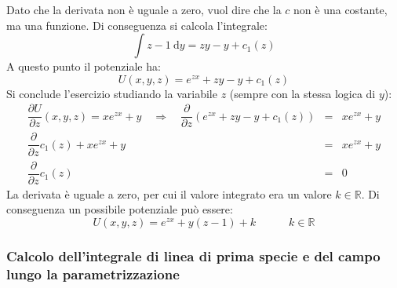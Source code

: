 \documentclass[a4paper]{article}
\begin{document}
	Dato che la derivata non è uguale a zero, vuol dire che la $c$ non è una costante, ma una funzione. Di conseguenza si calcola l'integrale:
	\begin{equation*}
		\displaystyle\int z-1 \:\mathrm{d}y = zy-y + c_{1}\left(z\right)
	\end{equation*}
	A questo punto il potenziale ha:
	\begin{equation*}
		U\left(x,y,z\right) = e^{zx} + zy - y + c_{1}\left(z\right)
	\end{equation*}
	Si conclude l'esercizio studiando la variabile $z$ (sempre con la stessa logica di $y$):
	\begin{equation*}
		\begin{array}{rcl}
			\dfrac{\partial U}{\partial z}\left(x,y,z\right) = xe^{zx}+y \hspace{1em}\Longrightarrow\hspace{1em} \dfrac{\partial}{\partial z}\left(e^{zx} + zy - y + c_{1}\left(z\right)\right) &=& xe^{zx}+y \\ [1em]
			\dfrac{\partial}{\partial z}c_{1}\left(z\right) + xe^{zx} + y &=& xe^{zx}+y \\ [1em]
			\dfrac{\partial}{\partial z}c_{1}\left(z\right) &=& 0
		\end{array}
	\end{equation*}
	La derivata è uguale a zero, per cui il valore integrato era un valore $k \in \mathbb{R}$. Di conseguenza un possibile potenziale può essere:
	\begin{equation*}
		U\left(x,y,z\right) = e^{zx} + y\left(z-1\right) + k \hspace{3em} k \in \mathbb{R}
	\end{equation*}

	\newpage

	\subsubsection{Calcolo dell'integrale di linea di prima specie e del campo lungo la parametrizzazione}
\end{document}
